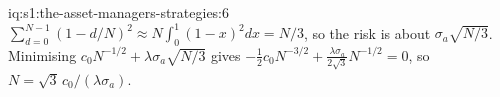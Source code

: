 \begin{solution}{iq:s1:the-asset-managers-strategies:6}
$\sum_{d=0}^{N-1}(1 - d/N)^2 \approx N\int_0^1(1 - x)^2dx = N/3$, so the risk is about $\sigma_a\sqrt{N/3}$. Minimising $c_0N^{-1/2} + \lambda\sigma_a
\sqrt{N/3}$ gives $-\tfrac12 c_0 N^{-3/2} + \tfrac{\lambda\sigma_a}{2\sqrt3}N^{-1/2} = 0$, so $N = \sqrt3\,c_0/(\lambda\sigma_a)$.
\end{solution}
